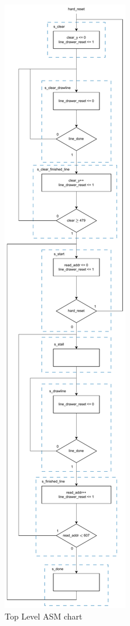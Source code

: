 \documentclass[11pt, titlepage]{article}
\begin{document}
            \begin{figure}[H]
                \centering
                \includegraphics[scale = 0.43]{Images/top level ASM chart.pdf}
                \caption{Top Level ASM chart}
            \end{figure}
\end{document}
